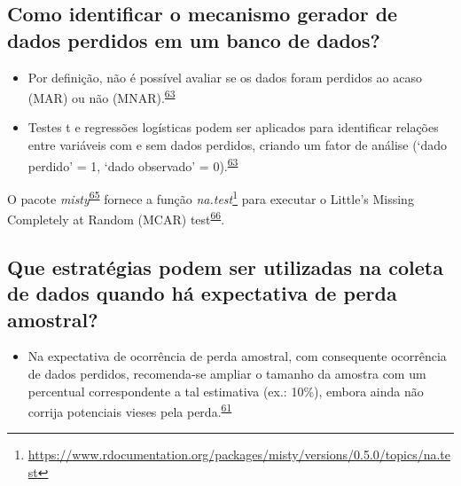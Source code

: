 \documentclass[
  a4paper,
]{book}
\providecommand{\tightlist}{%
  \setlength{\itemsep}{0pt}\setlength{\parskip}{0pt}}
\renewcommand{\href}[2]{#2\footnote{\url{#1}}}
\newenvironment{infobox}[1]
  {
  \begin{itemize}
  \renewcommand{\labelitemi}{
    \raisebox{-.7\height}[0pt][0pt]{
      {\setkeys{Gin}{width=3em,keepaspectratio}
        \texttt{[image: \#1]}}
    }
  }
  \setlength{\fboxsep}{1em}
  \begin{blackbox}
  \item
  }
  {
  \end{blackbox}
  \end{itemize}
  }
\begin{document}
\hypertarget{como-identificar-o-mecanismo-gerador-de-dados-perdidos-em-um-banco-de-dados}{%
\subsection{Como identificar o mecanismo gerador de dados perdidos em um banco de dados?}\label{como-identificar-o-mecanismo-gerador-de-dados-perdidos-em-um-banco-de-dados}}

\begin{itemize}
\item
  Por definição, não é possível avaliar se os dados foram perdidos ao acaso (MAR) ou não (MNAR).\textsuperscript{\protect\hyperlink{ref-Heymans2022}{63}}
\item
  Testes t e regressões logísticas podem ser aplicados para identificar relações entre variáveis com e sem dados perdidos, criando um fator de análise (`dado perdido' = 1, `dado observado' = 0).\textsuperscript{\protect\hyperlink{ref-Heymans2022}{63}}
\end{itemize}

\begin{infobox}{images/Rlogo}
O pacote \emph{misty}\textsuperscript{\protect\hyperlink{ref-misty}{65}} fornece a função \href{https://www.rdocumentation.org/packages/misty/versions/0.5.0/topics/na.test}{\emph{na.test}} para executar o Little's Missing Completely at Random (MCAR) test\textsuperscript{\protect\hyperlink{ref-little1988}{66}}.

\end{infobox}

\hypertarget{que-estratuxe9gias-podem-ser-utilizadas-na-coleta-de-dados-quando-huxe1-expectativa-de-perda-amostral}{%
\subsection{Que estratégias podem ser utilizadas na coleta de dados quando há expectativa de perda amostral?}\label{que-estratuxe9gias-podem-ser-utilizadas-na-coleta-de-dados-quando-huxe1-expectativa-de-perda-amostral}}

\begin{itemize}
\tightlist
\item
  Na expectativa de ocorrência de perda amostral, com consequente ocorrência de dados perdidos, recomenda-se ampliar o tamanho da amostra com um percentual correspondente a tal estimativa (ex.: 10\%), embora ainda não corrija potenciais vieses pela perda.\textsuperscript{\protect\hyperlink{ref-Altman2007}{61}}
\end{itemize}
\end{document}
